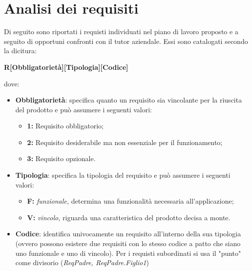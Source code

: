 \section{Analisi dei requisiti}
Di seguito sono riportati i requisti individuati nel piano di lavoro proposto e a seguito di opportuni confronti con il tutor aziendale. Essi sono catalogati secondo la dicitura:
\begin{center}
    \textbf{R[Obbligatorietà][Tipologia][Codice]}
\end{center}
dove:
\begin{itemize}
    \item \textbf{Obbligatorietà}: specifica quanto un requisito sia vincolante per la riuscita del prodotto e può assumere i seguenti valori:
    \begin{itemize}
        \item \textbf{1: } Requisito obbligatorio;
        \item \textbf{2: } Requisito desiderabile ma non essenziale per il funzionamento;
        \item \textbf{3: } Requisito opzionale.
    \end{itemize}
    \item \textbf{Tipologia}: specifica la tipologia del requisito e può assumere i seguenti valori:
    \begin{itemize}
        \item \textbf{F: }\textit{funzionale,} determina una funzionalità necessaria all'applicazione;
        \item \textbf{V: }\textit{vincolo,} riguarda una caratteristica del prodotto decisa a monte.
    \end{itemize}
    \item \textbf{Codice}: identifica univocamente un requisito all'interno della sua tipologia (ovvero possono esistere due requisiti con lo stesso codice a patto che siano uno funzionale e uno di vincolo). Per i requisti subordinati si usa il "punto" come divisorio (\textit{ReqPadre, ReqPadre.Figlio1})
\end{itemize}

